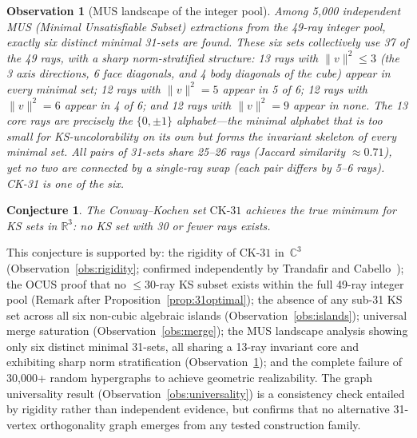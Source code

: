 \documentclass[12pt,a4paper]{article}
\newtheorem{conjecture}[theorem]{Conjecture}
\newtheorem{observation}[theorem]{Observation}
\newcommand{\R}{\mathbb{R}}
\newcommand{\C}{\mathbb{C}}
\newcommand{\CK}{\mathrm{CK}\text{-}31}
\begin{document}
\begin{observation}[MUS landscape of the integer pool]\label{obs:mus-landscape}
Among 5{,}000 independent MUS (Minimal Unsatisfiable Subset) extractions from the 49-ray integer pool, exactly \emph{six} distinct minimal 31-sets are found.  These six sets collectively use 37 of the 49 rays, with a sharp norm-stratified structure: 13 rays with $\|v\|^2 \leq 3$ (the 3 axis directions, 6 face diagonals, and 4 body diagonals of the cube) appear in \emph{every} minimal set; 12 rays with $\|v\|^2 = 5$ appear in 5 of 6; 12 rays with $\|v\|^2 = 6$ appear in 4 of 6; and 12 rays with $\|v\|^2 = 9$ appear in \emph{none}.  The 13 core rays are precisely the $\{0, \pm 1\}$ alphabet---the minimal alphabet that is too small for KS-uncolorability on its own but forms the invariant skeleton of every minimal set.  All pairs of 31-sets share 25--26 rays (Jaccard similarity $\approx 0.71$), yet no two are connected by a single-ray swap (each pair differs by 5--6 rays).  CK-31 is one of the six.
\end{observation}

\begin{conjecture}\label{conj:optimal}
The Conway--Kochen set $\CK$ achieves the true minimum for KS sets in $\R^3$: no KS set with 30 or fewer rays exists.
\end{conjecture}

This conjecture is supported by: the rigidity of $\CK$ in~$\C^3$ (Observation~\ref{obs:rigidity}; confirmed independently by Trandafir and Cabello~\cite{TrandafirCabello2025}); the OCUS proof that no $\leq 30$-ray KS subset exists within the full 49-ray integer pool (Remark after Proposition~\ref{prop:31optimal}); the absence of any sub-31 KS set across all six non-cubic algebraic islands (Observation~\ref{obs:islands}); universal merge saturation (Observation~\ref{obs:merge}); the MUS landscape analysis showing only six distinct minimal 31-sets, all sharing a 13-ray invariant core and exhibiting sharp norm stratification (Observation~\ref{obs:mus-landscape}); and the complete failure of 30{,}000+ random hypergraphs to achieve geometric realizability.  The graph universality result (Observation~\ref{obs:universality}) is a consistency check entailed by rigidity rather than independent evidence, but confirms that no alternative 31-vertex orthogonality graph emerges from any tested construction family.
\end{document}

